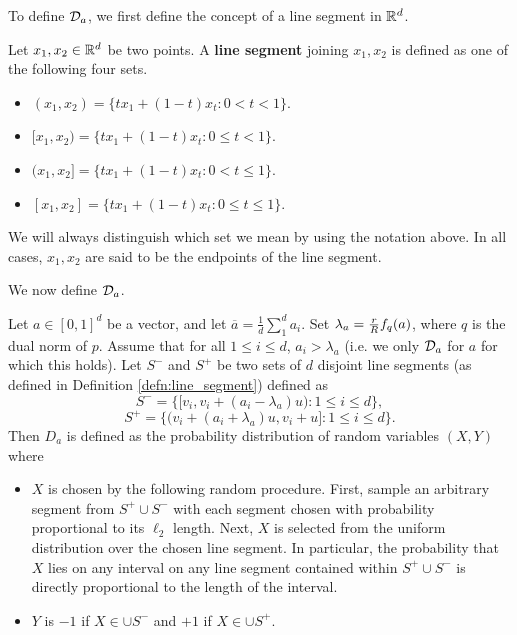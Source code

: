 To define ${\mathcal D}_a$, we first define the concept of a line segment in $\mathbb R^d$.
\begin{defn}\label{defn:line_segment}
Let $x_1, x_2 \in \mathbb R^d$ be two points. A \textbf{line segment} joining $x_1, x_2$ is defined as one of the following four sets. 
\begin{itemize}
	\item $(x_1, x_2) = \{tx_1 + (1-t)x_t: 0 < t < 1\}$.
	\item $[x_1, x_2) = \{tx_1 + (1-t)x_t: 0 \leq t < 1\}$.
	\item $(x_1, x_2] = \{tx_1 + (1-t)x_t: 0 < t \leq 1\}$.
	\item $[x_1, x_2] = \{tx_1 + (1-t)x_t: 0 \leq t \leq 1\}$.
\end{itemize}
We will always distinguish which set we mean by using the notation above. In all cases, $x_1, x_2$ are said to be the endpoints of the line segment. 
\end{defn}
We now define ${\mathcal D}_a$.
\begin{defn}\label{def:w_dist}
Let $a \in [0,1]^d$ be a vector, and let $\overline{a} = \frac{1}{d}\sum_1^d a_i$. Set $\lambda_a = \frac{r}{R}f_q(a)$, where $q$ is the dual norm of $p$. Assume that for all $1 \leq i \leq d$, $a_i > \lambda_a$ (i.e. we only ${\mathcal D}_a$ for $a$ for which this holds). Let $S^-$ and $S^+$ be two sets of $d$ disjoint line segments (as defined in Definition \ref{defn:line_segment}) defined as $$S^- = \{[v_i, v_i + (a_i - \lambda_a)u): 1 \leq i \leq d\},$$ $$S^+ = \{(v_i + (a_i + \lambda_a)u, v_i + u]: 1 \leq i \leq d\}.$$ Then $D_a$ is defined as the probability distribution of random variables $(X,Y)$ where 
\begin{itemize}
	\item $X$ is chosen by the following random procedure. First, sample an arbitrary segment from $S^+ \cup S^-$ with each segment chosen with probability proportional to its $\ell_2$ length. Next, $X$ is selected from the uniform distribution over the chosen line segment. In particular, the probability that $X$ lies on any interval on any line segment contained within $S^+ \cup S^-$ is directly proportional to the length of the interval. 
	\item $Y$ is $-1$ if $X \in \cup S^-$ and $+1$ if $X \in \cup S^+$.
\end{itemize}
\end{defn}


